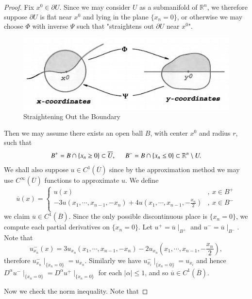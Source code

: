 \begin{proof}
Fix $x^0\in\partial U$. Since we may consider $U$ as a submanifold of $\mathbb{R}^n$, we therefore suppose $\partial U$ is flat near $x^0$ and lying in the plane $\{x_n=0\}$, or otherwise we may choose $\Phi$ with inverse $\Psi$ such that "straightens out $\partial U$ near $x^0$".\par
\begin{figure}[htbp]
    \center
    \includegraphics[scale=0.29]{Image/straightening out.png}
    \caption{Straightening Out the Boundary}
\end{figure}
Then we may assume there exists an open ball $B$, with center $x^0$ and radius $r$, such that 
$$
B^+=B\cap \left\{ x_n\ge 0 \right\} \subset \overline{U},\hspace{0.5cm}B^-=B\cap \left\{ x_n\le 0 \right\} \subset \mathbb{R} ^n\setminus U.
$$
We shall also suppose $u\in C^1(\overline{U})$ since by the approximation method we may use $C^\infty(\overline{U})$ functions to approximate $u$. We define 
$$
\overline{u}\left( x \right) =\left\{ \begin{aligned}
	u\left( x \right) &,\ x\in B^+\\
	-3u\left( x_1,\cdots ,x_{n-1},-x_n \right) +4u\left( x_1,\cdots ,x_{n-1},-\frac{x_n}{2} \right) &,\ x\in B^-\\
\end{aligned} \right. 
$$
we claim $\overline{u}\in C^1(\overline{B})$. Since the only possible discontinuous place is $\{x_n=0\}$, we compute each partial derivatives on $\{x_n=0\}$. Let $u^+=\overline{u}\mid_{B^+}$ and $u^-=\overline{u}\mid_{B^-}$. Note that 
$$
u_{x_n}^{-}\left( x \right) =3u_{x_n}\left( x_1,\cdots ,x_{n-1},-x_n \right) -2u_{x_n}\left( x_1,\cdots ,x_{n-1},-\frac{x_n}{2} \right) ,
$$
therefore $u_{x_n}^{-}\mid_{\{x_n=0\}}=u_{x_n}$. Similarly we have $u_{x_i}^{-}\mid_{\{x_n=0\}}=u_{x_i}$ and hence $D^\alpha u^-\mid_{\{x_n=0\}}=D^\alpha u^+\mid_{\{x_n=0\}}$ for each $|\alpha|\le 1$, and so $\overline{u}\in C^1(\overline{B})$.\par
Now we check the norm inequality. Note that 

\end{proof}
